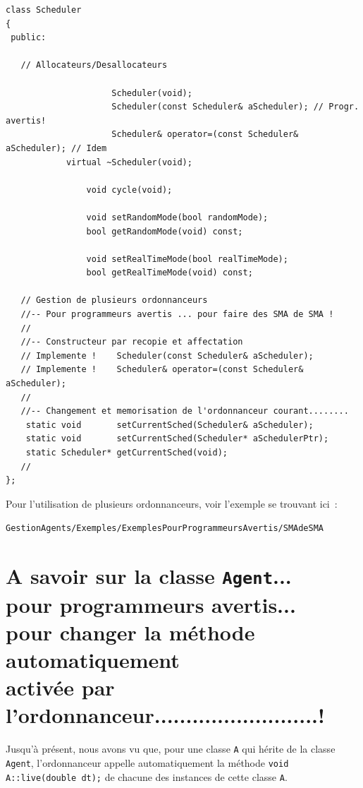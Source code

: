 \documentclass[12pt]{article}
\begin{document}
\begin{footnotesize}
\begin{verbatim}
class Scheduler
{
 public:

   // Allocateurs/Desallocateurs

                     Scheduler(void);
                     Scheduler(const Scheduler& aScheduler); // Progr. avertis!
                     Scheduler& operator=(const Scheduler& aScheduler); // Idem
            virtual ~Scheduler(void);

                void cycle(void);

                void setRandomMode(bool randomMode);
                bool getRandomMode(void) const;

                void setRealTimeMode(bool realTimeMode);
                bool getRealTimeMode(void) const;

   // Gestion de plusieurs ordonnanceurs
   //-- Pour programmeurs avertis ... pour faire des SMA de SMA !
   //
   //-- Constructeur par recopie et affectation
   // Implemente !    Scheduler(const Scheduler& aScheduler);
   // Implemente !    Scheduler& operator=(const Scheduler& aScheduler);
   //
   //-- Changement et memorisation de l'ordonnanceur courant........
    static void       setCurrentSched(Scheduler& aScheduler);
    static void       setCurrentSched(Scheduler* aSchedulerPtr);
    static Scheduler* getCurrentSched(void);
   //
};
\end{verbatim}
\end{footnotesize}

Pour l'utilisation de plusieurs ordonnanceurs,
voir l'exemple se trouvant ici~:
\begin{center}
{\tt GestionAgents/Exemples/ExemplesPourProgrammeursAvertis/SMAdeSMA}
\end{center}

\newpage

\section{A savoir sur la classe {\tt Agent}...\\
pour programmeurs avertis...\\
pour changer la m\'ethode automatiquement \\
activ\'ee par l'ordonnanceur..........................!}

Jusqu'\`a pr\'esent, nous avons vu que, pour une classe {\tt A} qui
h\'erite de la classe {\tt Agent}, l'ordonnanceur appelle automatiquement
la m\'ethode {\tt void A::live(double dt);} de chacune des instances
de cette classe {\tt A}.
\end{document}
